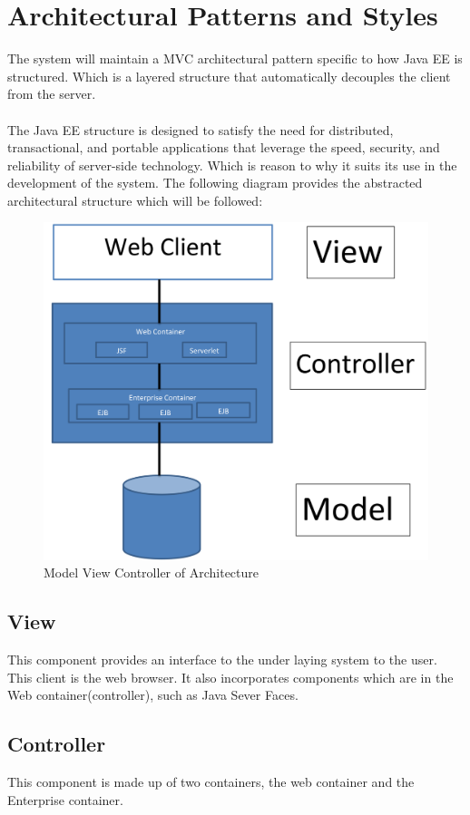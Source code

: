 \documentclass[12pt]{article}
\begin{document}
\section{Architectural Patterns and Styles} %
The system will maintain a MVC architectural pattern specific to how Java EE is structured. Which is a layered structure that automatically decouples the client from the server.\\
\\
The Java EE structure is designed to satisfy the need for distributed, transactional, and portable applications that leverage the speed, security, and reliability of server-side technology. Which is reason to why it suits its use in the development of the system. The following diagram provides the abstracted architectural structure which will be followed:
\begin{figure}
\includegraphics[scale=0.2]{../Images_Docs/Diagrams/Architecture/MVC.jpg}
\caption{Model View Controller of Architecture}
\end{figure}

\subsection*{View}
This component provides an interface to the under laying system to the user. This client is the web browser. It also incorporates components which are in the Web container(controller), such as Java Sever Faces. 
\subsection*{Controller}
This component is made up of two containers, the web container and the Enterprise container.
\end{document}
